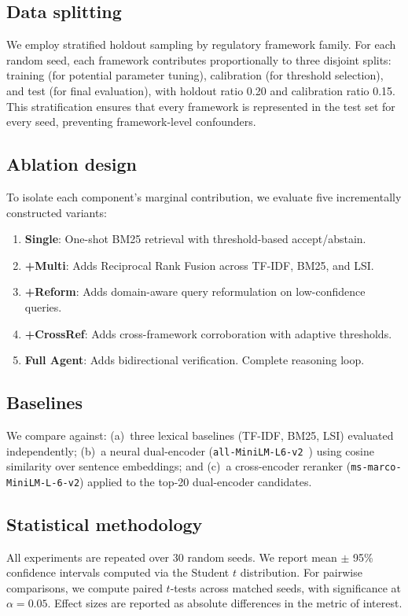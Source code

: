\documentclass[a4paper,fleqn]{cas-sc}
\begin{document}
\subsection{Data splitting}
We employ stratified holdout sampling by regulatory framework family.
For each random seed, each framework contributes proportionally to three disjoint splits: training (for potential parameter tuning), calibration (for threshold selection), and test (for final evaluation), with holdout ratio 0.20 and calibration ratio 0.15.
This stratification ensures that every framework is represented in the test set for every seed, preventing framework-level confounders.

\subsection{Ablation design}
To isolate each component's marginal contribution, we evaluate five incrementally constructed variants:
\begin{enumerate}
    \item \textbf{Single}: One-shot BM25 retrieval with threshold-based accept/abstain.
    \item \textbf{+Multi}: Adds Reciprocal Rank Fusion across TF-IDF, BM25, and LSI.
    \item \textbf{+Reform}: Adds domain-aware query reformulation on low-confidence queries.
    \item \textbf{+CrossRef}: Adds cross-framework corroboration with adaptive thresholds.
    \item \textbf{Full Agent}: Adds bidirectional verification. Complete reasoning loop.
\end{enumerate}

\subsection{Baselines}
We compare against:
(a)~three lexical baselines (TF-IDF, BM25, LSI) evaluated independently;
(b)~a neural dual-encoder (\texttt{all-MiniLM-L6-v2}~\citep{Reimers2019}) using cosine similarity over sentence embeddings; and
(c)~a cross-encoder reranker (\texttt{ms-marco-MiniLM-L-6-v2}) applied to the top-20 dual-encoder candidates.

\subsection{Statistical methodology}
All experiments are repeated over 30 random seeds.
We report mean $\pm$ 95\% confidence intervals computed via the Student $t$ distribution.
For pairwise comparisons, we compute paired $t$-tests across matched seeds, with significance at $\alpha = 0.05$.
Effect sizes are reported as absolute differences in the metric of interest.
\end{document}
